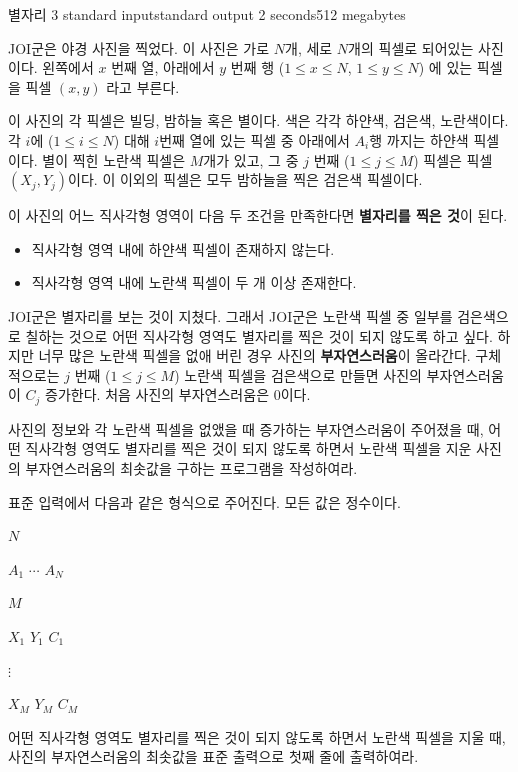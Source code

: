 \begin{problem}{별자리 3}
	{standard input}{standard output}
	{2 seconds}{512 megabytes}{}
	
	JOI군은 야경 사진을 찍었다. 이 사진은 가로 $N$개, 세로 $N$개의 픽셀로 되어있는 사진이다. 왼쪽에서 $x$ 번째 열, 아래에서 $y$ 번째 행 ($1 \le x \le N$, $1 \le y \le N$) 에 있는 픽셀을 픽셀 $(x, y)$ 라고 부른다.
	
	이 사진의 각 픽셀은 빌딩, 밤하늘 혹은 별이다. 색은 각각 하얀색, 검은색, 노란색이다. 각 $i$에 ($1 \le i \le N$) 대해 $i$번째 열에 있는 픽셀 중 아래에서 $A_i$행 까지는 하얀색 픽셀이다. 별이 찍힌 노란색 픽셀은 $M$개가 있고, 그 중 $j$ 번째 ($1 \le j \le M$) 픽셀은 픽셀 $(X_j, Y_j)$이다. 이 이외의 픽셀은 모두 밤하늘을 찍은 검은색 픽셀이다.
	
	이 사진의 어느 직사각형 영역이 다음 두 조건을 만족한다면 \textbf{별자리를 찍은 것}이 된다.
	
	\begin{itemize}
		\item 직사각형 영역 내에 하얀색 픽셀이 존재하지 않는다.
		\item 직사각형 영역 내에 노란색 픽셀이 두 개 이상 존재한다.
	\end{itemize}

	JOI군은 별자리를 보는 것이 지쳤다. 그래서 JOI군은 노란색 픽셀 중 일부를 검은색으로 칠하는 것으로 어떤 직사각형 영역도 별자리를 찍은 것이 되지 않도록 하고 싶다. 하지만 너무 많은 노란색 픽셀을 없애 버린 경우 사진의 \textbf{부자연스러움}이 올라간다. 구체적으로는 $j$ 번째 ($1 \le j \le M$) 노란색 픽셀을 검은색으로 만들면 사진의 부자연스러움이 $C_j$ 증가한다. 처음 사진의 부자연스러움은 0이다.
	
	사진의 정보와 각 노란색 픽셀을 없앴을 때 증가하는 부자연스러움이 주어졌을 때, 어떤 직사각형 영역도 별자리를 찍은 것이 되지 않도록 하면서 노란색 픽셀을 지운 사진의 부자연스러움의 최솟값을 구하는 프로그램을 작성하여라.
	
	
\InputFile

표준 입력에서 다음과 같은 형식으로 주어진다. 모든 값은 정수이다.

$N$ 

$A_1$ $\cdots$ $A_N$

$M$

$X_1$ $Y_1$ $C_1$

$\vdots$

$X_M$ $Y_M$ $C_M$

\OutputFile

어떤 직사각형 영역도 별자리를 찍은 것이 되지 않도록 하면서 노란색 픽셀을 지울 때, 사진의 부자연스러움의 최솟값을 표준 출력으로 첫째 줄에 출력하여라.


\end{problem}
